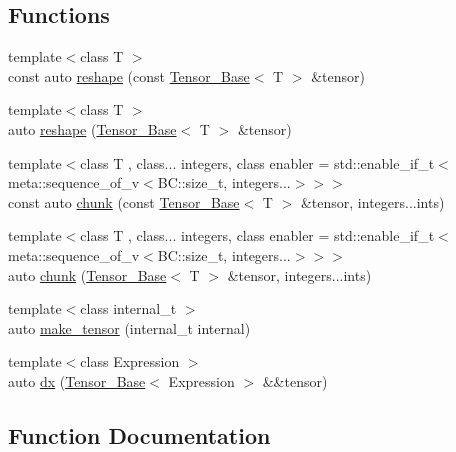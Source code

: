 \subsection*{Functions}
\begin{DoxyCompactItemize}
\item 
{\footnotesize template$<$class T $>$ }\\const auto \hyperlink{namespaceBC_1_1tensors_ac23278111b92f60836a27d68b89d3785}{reshape} (const \hyperlink{classBC_1_1tensors_1_1Tensor__Base}{Tensor\+\_\+\+Base}$<$ T $>$ \&tensor)
\item 
{\footnotesize template$<$class T $>$ }\\auto \hyperlink{namespaceBC_1_1tensors_a73879db07d333425cbbfc591bca93191}{reshape} (\hyperlink{classBC_1_1tensors_1_1Tensor__Base}{Tensor\+\_\+\+Base}$<$ T $>$ \&tensor)
\item 
{\footnotesize template$<$class T , class... integers, class enabler  = std\+::enable\+\_\+if\+\_\+t$<$meta\+::sequence\+\_\+of\+\_\+v$<$\+B\+C\+::size\+\_\+t, integers...$>$$>$$>$ }\\const auto \hyperlink{namespaceBC_1_1tensors_ad65c72f282ad5b587712064d6a443ce8}{chunk} (const \hyperlink{classBC_1_1tensors_1_1Tensor__Base}{Tensor\+\_\+\+Base}$<$ T $>$ \&tensor, integers...\+ints)
\item 
{\footnotesize template$<$class T , class... integers, class enabler  = std\+::enable\+\_\+if\+\_\+t$<$meta\+::sequence\+\_\+of\+\_\+v$<$\+B\+C\+::size\+\_\+t, integers...$>$$>$$>$ }\\auto \hyperlink{namespaceBC_1_1tensors_ac34cd4c624314a9f60d5056830cafdce}{chunk} (\hyperlink{classBC_1_1tensors_1_1Tensor__Base}{Tensor\+\_\+\+Base}$<$ T $>$ \&tensor, integers...\+ints)
\item 
{\footnotesize template$<$class internal\+\_\+t $>$ }\\auto \hyperlink{namespaceBC_1_1tensors_accfccc1f630cc1d94eda6ab5603a34df}{make\+\_\+tensor} (internal\+\_\+t internal)
\item 
{\footnotesize template$<$class Expression $>$ }\\auto \hyperlink{namespaceBC_1_1tensors_a69d386812fe0d7d009849e50bc26e5fe}{dx} (\hyperlink{classBC_1_1tensors_1_1Tensor__Base}{Tensor\+\_\+\+Base}$<$ Expression $>$ \&\&tensor)
\end{DoxyCompactItemize}


\subsection{Function Documentation}
